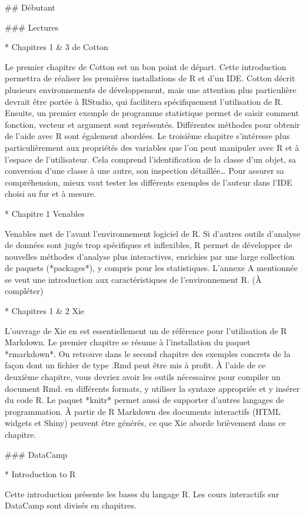 \documentclass[
  letterpaper,
]{scrbook}
\begin{document}
\#\# Débutant

\#\#\# Lectures

* Chapitres 1 \& 3 de Cotton

Le premier chapitre de Cotton est un bon point de départ. Cette
introduction permettra de réaliser les premières installations de R et
d'un IDE. Cotton décrit plusieurs environnements de développement, mais
une attention plus particulière devrait être portée à RStudio, qui
facilitera spécifiquement l'utilisation de R. Ensuite, un premier
exemple de programme statistique permet de saisir comment fonction,
vecteur et argument sont représentés. Différentes méthodes pour obtenir
de l'aide avec R sont également abordées. Le troisième chapitre
s'intéresse plus particulièrement aux propriétés des variables que l'on
peut manipuler avec R et à l'espace de l'utilisateur. Cela comprend
l'identification de la classe d'un objet, sa conversion d'une classe à
une autre, son inspection détaillée\ldots{} Pour assurer sa
compréhension, mieux vaut tester les différents exemples de l'auteur
dans l'IDE choisi au fur et à mesure.

* Chapitre 1 Venables

Venables met de l'avant l'environnement logiciel de R. Si d'autres
outils d'analyse de données sont jugés trop spécifiques et inflexibles,
R permet de développer de nouvelles méthodes d'analyse plus
interactives, enrichies par une large collection de paquets
(*packages*), y compris pour les statistiques. L'annexe A mentionnée se
veut une introduction aux caractéristiques de l'environnement R. (À
compléter)

* Chapitres 1 \& 2 Xie

L'ouvrage de Xie en est essentiellement un de référence pour
l'utilisation de R Markdown. Le premier chapitre se résume à
l'installation du paquet *rmarkdown*. On retrouve dans le second
chapitre des exemples concrets de la façon dont un fichier de type .Rmd
peut être mis à profit. À l'aide de ce deuxième chapitre, vous devriez
avoir les outils nécessaires pour compiler un document Rmd. en
différents formats, y utiliser la syntaxe appropriée et y insérer du
code R. Le paquet *knitr* permet aussi de supporter d'autres langages de
programmation. À partir de R Markdown des documents interactifs (HTML
widgets et Shiny) peuvent être générés, ce que Xie aborde brièvement
dans ce chapitre.

\#\#\# DataCamp

* Introduction to R

Cette introduction présente les bases du langage R. Les cours
interactifs sur DataCamp sont divisés en chapitres.
\end{document}
